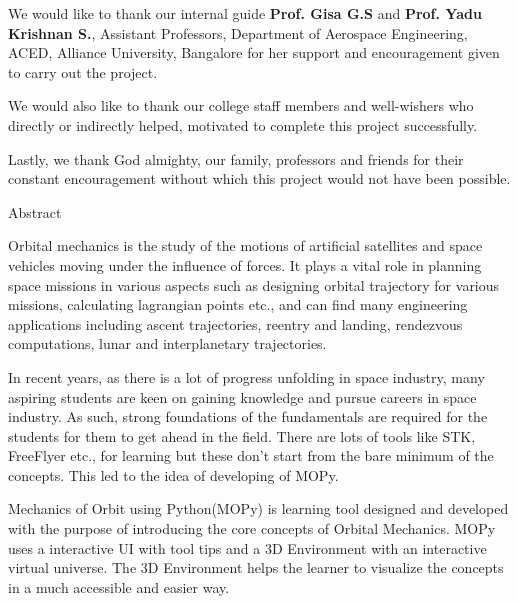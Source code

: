 \documentclass[12pt]{article}
\begin{document}
We would like to thank our internal guide \textbf{Prof. Gisa G.S} and \textbf{Prof. Yadu Krishnan S.}, Assistant Professors, Department of Aerospace Engineering, ACED, Alliance University, Bangalore for her support and encouragement given to carry out the project. \par

We would also like to thank our college staff members and well-wishers who directly or indirectly helped, motivated to complete this project successfully. \par

Lastly, we thank God almighty, our family, professors and friends for their constant encouragement without which this project would not have been possible.\\
\thispagestyle{empty}
\newpage
\begin{center}
\Large Abstract
\end{center}
\normalsize
\hspace{4em}Orbital mechanics is the study of the motions of artificial satellites and space vehicles moving under the influence of forces. It plays a vital role in planning space missions in various aspects such as designing orbital trajectory for various missions, calculating lagrangian points etc., and can find many engineering applications  including ascent trajectories, reentry and landing, rendezvous computations, lunar and interplanetary trajectories. 

In recent years, as there is a lot of progress unfolding in space industry, many aspiring students are keen on gaining knowledge and pursue careers in space industry. As such, strong foundations of the fundamentals are required for the students for them to get ahead in the field. There are lots of tools like STK, FreeFlyer etc., for learning but these don't start from the bare minimum of the concepts. This led to the idea of developing of MOPy.

Mechanics of Orbit using Python(MOPy) is learning tool designed and developed with the purpose of introducing the core concepts of Orbital Mechanics. MOPy uses a interactive UI with tool tips and a 3D Environment with an interactive virtual universe. The 3D Environment helps the learner to visualize the concepts in a much accessible and easier way.

\thispagestyle{empty}
\newpage
\thispagestyle{empty}
\tableofcontents
\listoffigures
\thispagestyle{empty}
\listoftables
\thispagestyle{empty}
\newpage
\setcounter{page}{1}
\end{document}
